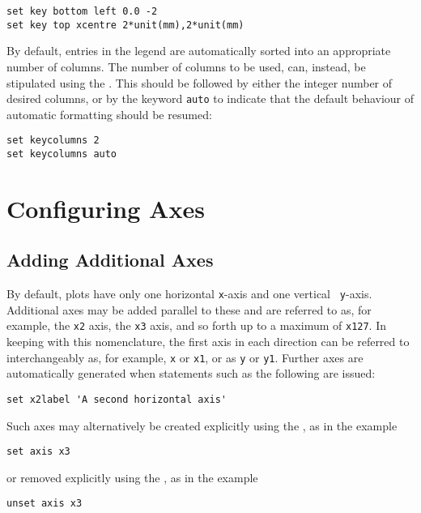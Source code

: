 \begin{verbatim}
set key bottom left 0.0 -2
set key top xcentre 2*unit(mm),2*unit(mm)
\end{verbatim}

By default, entries in the legend are automatically sorted into an appropriate
number of columns. The number of columns to be used, can, instead, be
stipulated using the . This should be followed by
either the integer number of desired columns, or by the keyword {\tt auto} to
indicate that the default behaviour of automatic formatting should be resumed:

\begin{verbatim}
set keycolumns 2
set keycolumns auto
\end{verbatim}

\section{Configuring Axes}

\subsection{Adding Additional Axes}
\label{sec:multiple_axes}

By default, plots have only one horizontal {\tt x}-axis and one vertical {\tt
y}-axis.  Additional axes may be added parallel to these and are referred to
as, for example, the {\tt x2} axis, the {\tt x3} axis, and so forth up to a
maximum of {\tt x127}.  In keeping with this nomenclature, the first axis in
each direction can be referred to interchangeably as, for example, {\tt x} or
{\tt x1}, or as {\tt y} or {\tt y1}.  Further axes are automatically generated
when statements such as the following are issued:

\begin{verbatim}
set x2label 'A second horizontal axis'
\end{verbatim}

\noindent Such axes may alternatively be created explicitly using the
, as in the example

\begin{verbatim}
set axis x3
\end{verbatim}

\noindent or removed explicitly using the , as in the
example

\begin{verbatim}
unset axis x3
\end{verbatim}

